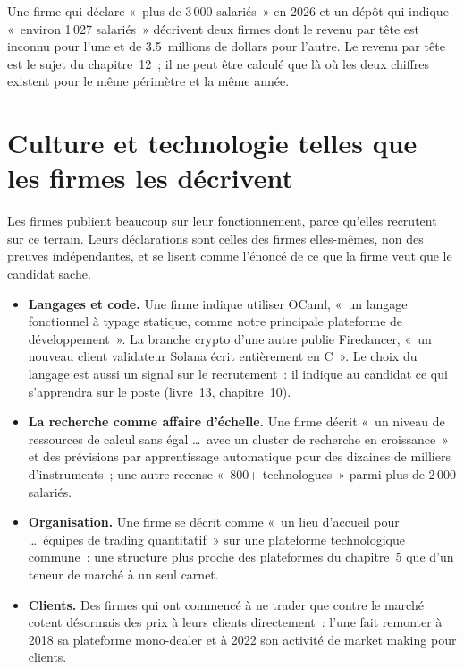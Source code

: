 \begin{remark}\label{rem:in:proprietary-market-makers-and-high-frequency-firms:heads}
Une firme qui déclare «~plus de 3\,000 salariés~» en 2026 et un dépôt qui indique «~environ 1\,027 salariés~»
décrivent deux firmes dont le revenu par tête est inconnu pour l'une et de 3.5~millions de dollars pour l'autre. Le revenu par tête est le sujet du chapitre~12~; il ne peut être calculé que là où les deux chiffres existent pour
le même périmètre et la même année.
\end{remark}

\section{Culture et technologie telles que les firmes les décrivent}

Les firmes publient beaucoup sur leur fonctionnement, parce qu'elles recrutent sur ce terrain. Leurs déclarations sont celles des firmes
elles-mêmes, non des preuves indépendantes, et se lisent comme l'énoncé de ce que la firme veut que le candidat sache.
\begin{itemize}
\item \textbf{Langages et code.} Une firme indique utiliser OCaml, «~un langage fonctionnel à typage statique, comme notre
principale plateforme de développement~». La branche crypto d'une autre publie Firedancer, «~un nouveau client validateur Solana écrit
entièrement en C~». Le choix du langage est aussi un signal sur le recrutement~: il indique au candidat ce qui s'apprendra sur
le poste (livre~13, chapitre~10).
\item \textbf{La recherche comme affaire d'échelle.} Une firme décrit «~un niveau de ressources de calcul sans égal \dots\ avec un
cluster de recherche en croissance~» et des prévisions par apprentissage automatique pour des dizaines de milliers d'instruments~; une autre recense «~800+
technologues~» parmi plus de 2\,000 salariés.
\item \textbf{Organisation.} Une firme se décrit comme «~un lieu d'accueil pour \dots\ équipes de trading quantitatif~» sur une
plateforme technologique commune~: une structure plus proche des plateformes du chapitre~5 que d'un teneur de marché à un seul carnet.
\item \textbf{Clients.} Des firmes qui ont commencé à ne trader que contre le marché cotent désormais des prix à leurs clients directement~: l'une
fait remonter à 2018 sa plateforme mono-dealer et à 2022 son activité de market making pour clients.
\end{itemize}


